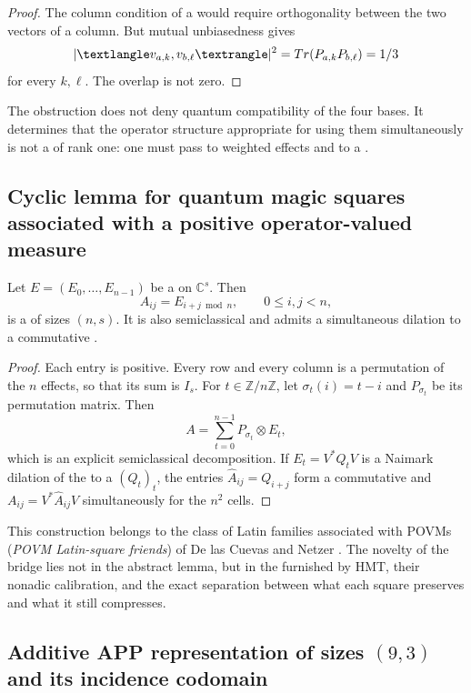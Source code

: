 \begin{proof}
The column condition of a \QLS would require orthogonality between the two
vectors of a column. But mutual unbiasedness gives
\[
 |\langle v_{a,k},v_{b,\ell}\rangle|^2
 =\Tr(P_{a,k}P_{b,\ell})=\frac13
\]
for every $k,\ell$. The overlap is not zero.
\end{proof}

The obstruction does not deny quantum compatibility of the four bases.
It determines that the operator structure appropriate for using them simultaneously is not a
\QLS of rank one: one must pass to weighted effects and to a \QMS.

\subsection{Cyclic lemma for quantum magic squares associated with a positive operator-valued measure}

\begin{lemma}
\label{p12-83-c22-s3:gmc:lem:qms-ciclico}
Let $E=(E_0,\ldots,E_{n-1})$ be a \POVM on $\mathbb C^s$. Then
\[
 A_{ij}=E_{i+j\bmod n},
 \qquad 0\le i,j<n,
 \tag{GMC-4.3}
\]
is a \QMS of sizes $(n,s)$. It is also semiclassical and admits a
simultaneous dilation to a commutative \QPM.
\end{lemma}

\begin{proof}
Each entry is positive. Every row and every column is a permutation of the
$n$ effects, so that its sum is $I_s$. For $t\in\mathbb Z/n\mathbb Z$,
let $\sigma_t(i)=t-i$ and $P_{\sigma_t}$ be its permutation matrix. Then
\[
 A=\sum_{t=0}^{n-1}P_{\sigma_t}\otimes E_t,
 \tag{GMC-4.4}
\]
which is an explicit semiclassical decomposition. If
$E_t=V^*Q_tV$ is a Naimark dilation of the \POVM to a \PVM
$(Q_t)_t$, the entries
$\widehat A_{ij}=Q_{i+j}$ form a commutative \QPM and
$A_{ij}=V^*\widehat A_{ij}V$ simultaneously for the $n^2$ cells.
\end{proof}

This construction belongs to the class of Latin families associated with POVMs
(\emph{POVM Latin-square friends})
of De las Cuevas and Netzer \citep{delascuevas2023latin}. The novelty of the bridge lies not in the
abstract lemma, but in the \POVM furnished by HMT, their nonadic calibration, and the
exact separation between what each square preserves and what it still
compresses.

\subsection{Additive APP representation of sizes \((9,3)\) and its incidence codomain}

